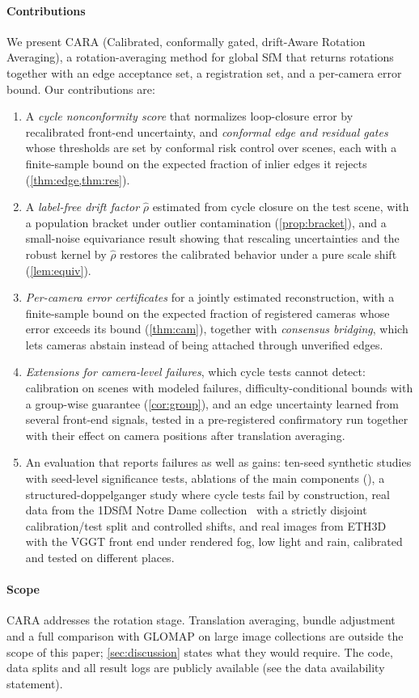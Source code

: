 \paragraph*{Contributions} We present CARA (Calibrated, conformally gated, drift-Aware Rotation Averaging), a rotation-averaging method for global SfM that returns rotations together with an edge acceptance set, a registration set, and a per-camera error bound. Our contributions are:
\begin{enumerate}
\item A \emph{cycle nonconformity score} that normalizes loop-closure error by recalibrated front-end uncertainty, and \emph{conformal edge and residual gates} whose thresholds are set by conformal risk control over scenes, each with a finite-sample bound on the expected fraction of inlier edges it rejects (\cref{thm:edge,thm:res}).
\item A \emph{label-free drift factor} $\hat\rho$ estimated from cycle closure on the test scene, with a population bracket under outlier contamination (\cref{prop:bracket}), and a small-noise equivariance result showing that rescaling uncertainties and the robust kernel by $\hat\rho$ restores the calibrated behavior under a pure scale shift (\cref{lem:equiv}).
\item \emph{Per-camera error certificates} for a jointly estimated reconstruction, with a finite-sample bound on the expected fraction of registered cameras whose error exceeds its bound (\cref{thm:cam}), together with \emph{consensus bridging}, which lets cameras abstain instead of being attached through unverified edges.
\item \emph{Extensions for camera-level failures}, which cycle tests cannot detect: calibration on scenes with modeled failures, difficulty-conditional bounds with a group-wise guarantee (\cref{cor:group}), and an edge uncertainty learned from several front-end signals, tested in a pre-registered confirmatory run together with their effect on camera positions after translation averaging.
\item An evaluation that reports failures as well as gains: ten-seed synthetic studies with seed-level significance tests, ablations of the main components (), a structured-doppelganger study where cycle tests fail by construction, real data from the 1DSfM Notre Dame collection~\cite{wilson2014robust} with a strictly disjoint calibration/test split and controlled shifts, and real images from ETH3D~\cite{schops2017eth3d} with the VGGT front end under rendered fog, low light and rain, calibrated and tested on different places.
\end{enumerate}

\paragraph*{Scope} CARA addresses the rotation stage. Translation averaging, bundle adjustment and a full comparison with GLOMAP on large image collections are outside the scope of this paper; \cref{sec:discussion} states what they would require. The code, data splits and all result logs are publicly available (see the data availability statement).
